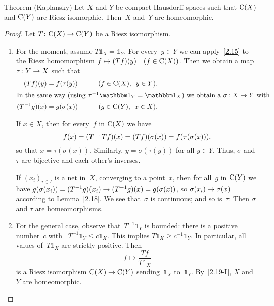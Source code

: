 \documentclass[main.tex]{subfiles}
\begin{document}
%
%
\begin{psec}{2.19}{Theorem (Kaplansky)}
Let $X$ and $Y$ be compact Hausdorff spaces
such that $\mathrm{C}(X)$ and $\mathrm{C}(Y)$ are Riesz isomorphic.
Then~$X$ and~$Y$ are homeomorphic.
\end{psec}
\begin{proof}
Let $T\colon \mathrm{C}(X)\rightarrow \mathrm{C}(Y)$ be a Riesz isomorphism.
\begin{enumerate}[label=(\Roman*)]
\item \label{2.19-I}
For the moment, assume 
$T\mathbb{1}_X = \mathbb{1}_Y$.
For every~$y\in Y$ 
we can apply~\ref{2.15} to the Riesz homomorphism
$f\mapsto (Tf)(y)\quad (f\in\mathrm{C}(X))$.
Then we obtain a map $\tau\colon Y\rightarrow X$ such that
\begin{alignat*}{2}
(Tf)(y) &= f(\tau(y)) 
\qquad &(f\in\Cont{X}\htam{, }\ y\in Y)
\htam{.}\\
\intertext{%
In the same way (using $\tau^{-1} \mathbb{1}_Y = \mathbb{1}_X$)
we obtain a $\sigma\colon X\ra Y$ with}
(T^{-1}g)(x) &= g(\sigma(x)) 
 &(g\in \Cont{Y}\htam{, }\ x\in X)
\htam{.}
\end{alignat*}

If $x\in X$, then for every~$f$ in $\mathrm{C}(X)$ we have
\begin{equation*}
f(x) = (T^{-1} T f)(x) = (Tf)(\sigma(x)) = f(\tau(\sigma (x)))\text{,}
\end{equation*}
so that $x=\tau(\sigma(x))$.
Similarly, $y=\sigma(\tau(y))$ for all $y\in Y$.
Thus, $\sigma$ and~$\tau$ are bijective and each other's inverses.

If $(x_i)_{i \in I}$ is a net in~$X$,
converging to a point~$x$,
then for all~$g$ in $\mathrm{C}(Y)$
we have $g(\sigma(x_i))=(T^{-1} g)(x_i)\rightarrow (T^{-1}g)(x)=g(\sigma(x))$,
so $\sigma(x_i)\rightarrow \sigma(x)$ according to Lemma~\ref{2.18}.
We see that~$\sigma$ is continuous;
and so is~$\tau$.
Then $\sigma$ and $\tau$ are homeomorphisms.
%
\item \label{2.19-II}
For the general case,
observe that~$T^{-1}\mathbb{1}_Y$ is bounded:
there is a positive number~$c$ 
with ~$T^{-1}\mathbb{1}_Y \leq c \mathbb{1}_X$.
This implies $T\mathbb{1}_X \ge c^{-1} \mathbb{1}_Y$.
In particular,
all values of~$T\mathbb{1}_X$ are strictly positive.
Then
\begin{equation*}
f \mapsto \frac{Tf}{T\mathbb{1}_X}
\end{equation*}
is a Riesz isomorphism $\mathrm{C}(X)\rightarrow\mathrm{C}(Y)$
sending~$\mathbb{1}_X$ to~$\mathbb{1}_Y$.
By~\ref{2.19-I}, 
$X$ and~$Y$ are homeomorphic. \xqed
\end{enumerate}
\end{proof}
\end{document}
